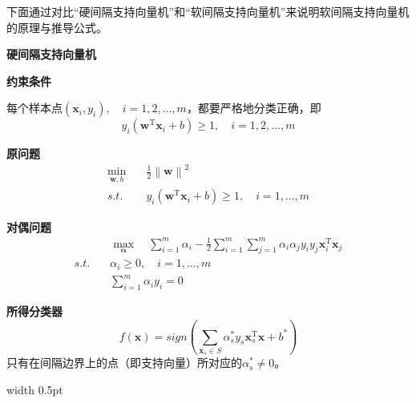 \documentclass[withoutpreface,bwprint]{NoteBook}
\begin{document}
下面通过对比“硬间隔支持向量机”和“软间隔支持向量机”来说明软间隔支持向量机的原理与推导公式。
\vspace{0.01\textwidth} %

\noindent
\begin{minipage}[t]{0.48\textwidth} %
    \centering %
    \textbf{硬间隔支持向量机}

    \textbf{约束条件}

    每个样本点$(\mathbf{x}_i,y_i),\quad i=1,2,\dots,m $，都要严格地分类正确，即
    $$
    y_i(\mathbf{w}^\mathrm{T} \mathbf{x}_i + b) \geq 1, \quad i=1,2,\dots,m
    $$

    \textbf{原问题}
    \begin{align*}
        \min_{\mathbf{w},b} \quad & \frac{1}{2}\left\| \mathbf{w} \right\|^2 \\
        s.t. \quad & y_i(\mathbf{w}^\mathrm{T} \mathbf{x}_i + b) \geq 1, \quad i=1,\dots,m    
    \end{align*}
    
    \textbf{对偶问题}
    \begin{align*}
        & \max_{\bm{\alpha}} \quad \sum_{i=1}^{m} \alpha_i - \frac{1}{2} \sum_{i=1}^{m} \sum_{j=1}^{m} \alpha_i \alpha_j y_i y_j \mathbf{x}_i^\mathrm{T} \mathbf{x}_j \\
        s.t. \quad & \alpha_i \geq 0, \quad i=1,\dots,m \\
                    & \sum_{i=1}^{m} \alpha_i y_i = 0
    \end{align*}

    \textbf{所得分类器}
    \begin{equation*}
        f(\mathbf{x}) = sign \left( \sum_{\mathbf{x}_s \in S} \alpha_s^* y_s \mathbf{x}_s^\mathrm{T} \mathbf{x} + b^* \right)
    \end{equation*}
    只有在间隔边界上的点（即支持向量）所对应的$\alpha_s^* \neq 0$。
\end{minipage}
\hspace{0.01\textwidth} %
\vrule width 0.5pt %
\hspace{0.01\textwidth} %
\end{document}
